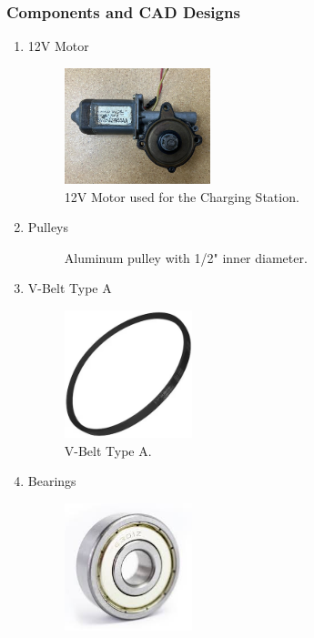 \subsubsection{Components and CAD Designs}
    \begin{enumerate}
        \item 12V Motor
            \begin{figure}[H]
                \centering
                \includegraphics[width=0.4\textwidth]{MECANISMO/MOTOR_12V.jpg}
                \caption{12V Motor used for the Charging Station.}
                \label{fig:etiqueta}
            \end{figure}
        \item Pulleys
            \begin{figure}[H]
                \centering
                \caption{Aluminum pulley with 1/2" inner diameter.}
                \label{fig:etiqueta}
            \end{figure}
        \item V-Belt Type A
        \begin{figure}[H]
                \centering
                \includegraphics[width=0.35\textwidth]{MECANISMO/BANDA_V_TIPOA-transformed.jpg}
                \caption{V-Belt Type A.}
                \label{fig:etiqueta}
            \end{figure}
        \item Bearings
        \begin{figure}[H]
                \centering
                \includegraphics[width=0.35\textwidth]{MECANISMO/balero.jpeg}

\end{figure}
\end{enumerate}
